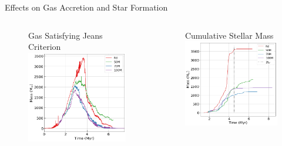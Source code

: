 \documentclass[aspectratio=169]{beamer}
\begin{document}
\begin{frame}{Effects on Gas Accretion and Star Formation}{}
    \begin{columns}
        \begin{column}{0.45\textwidth}
            \begin{figure}[h!]
                Gas Satisfying Jeans Criterion
                \includegraphics[width=\linewidth]{../images/jeans_gas_mass.png} \\
                \label{fig:jeans_mass}
            \end{figure}
        \end{column}
        \begin{column}{0.45\textwidth}
            \begin{figure}[h!]
            	Cumulative Stellar Mass
                \includegraphics[width=\linewidth]{../images/cumulative_stellar_mass_fixes.png} \\

\end{figure}
\end{column}
\end{columns}
\end{frame}
\end{document}
